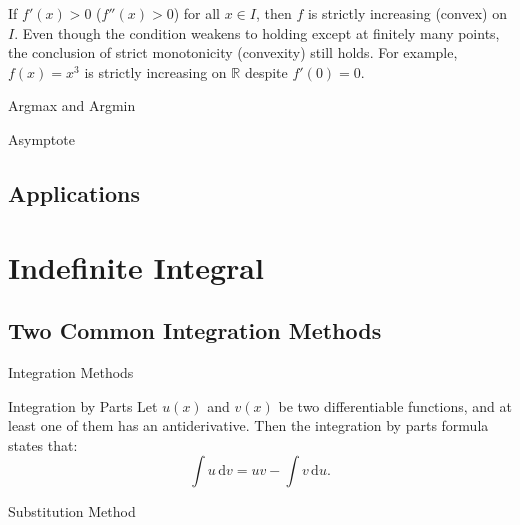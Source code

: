 \documentclass[11pt]{../../TexTemplate/elegantbook}
\begin{document}
\begin{note}
    If \(f'(x) > 0\) (\(f''(x) > 0\)) for all \(x \in I\), then \(f\) is strictly increasing (convex) on \(I\).
    Even though the condition weakens to holding except at finitely many points,
    the conclusion of strict monotonicity (convexity) still holds.
    For example, \(f(x) = x^3\) is strictly increasing on \(\mathbb{R}\)
    despite \(f'(0) = 0\).
\end{note}


\begin{leftbarTitle}{Argmax and Argmin}\end{leftbarTitle}


\begin{leftbarTitle}{Asymptote}\end{leftbarTitle}







\section{Applications}




\chapter{Indefinite Integral}

\section{Two Common Integration Methods}
\begin{leftbarTitle}{Integration Methods}\end{leftbarTitle}
\begin{definition}{Integration by Parts}
    Let \( u(x) \) and \( v(x) \) be two differentiable functions,
    and at least one of them has an antiderivative.
    Then the integration by parts formula states that:
    \[
        \int u \, \mathrm{d}v = uv - \int v \, \mathrm{d}u.
    \]
\end{definition}

\begin{definition}{Substitution Method}
\end{definition}
\end{document}
